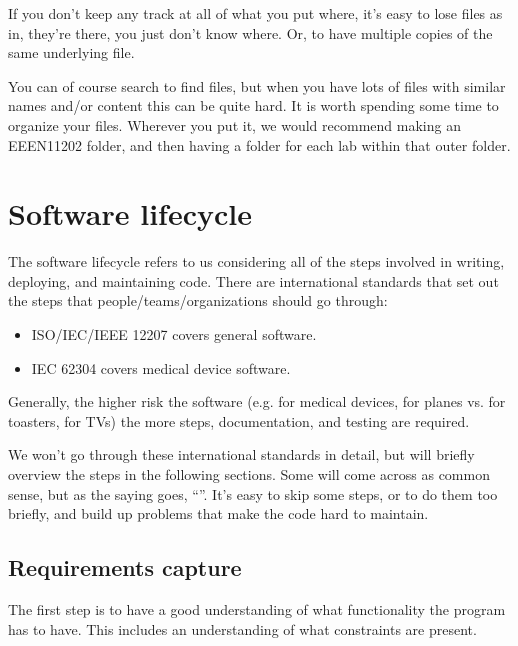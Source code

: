 \documentclass[letterpaper,10pt,british]{sphinxmanual}
\begin{document}
\sphinxAtStartPar
If you don’t keep any track at all of what you put where, it’s easy to lose files \sphinxhyphen{} as in, they’re there, you just don’t know where. Or, to have multiple copies of the same underlying file.

\sphinxAtStartPar
You can of course search to find files, but when you have lots of files with similar names and/or content this can be quite hard. It is worth spending some time to organize your files. Wherever you put it, we would recommend making an EEEN11202 folder, and then having a folder for each lab within that outer folder.

\sphinxstepscope


\chapter{Software lifecycle}
\label{\detokenize{chapters/software_lifecycle:software-lifecycle}}\label{\detokenize{chapters/software_lifecycle::doc}}
\sphinxAtStartPar
The software lifecycle refers to us considering all of the steps involved in writing, deploying, and maintaining code. There are international standards that set out the steps that people/teams/organizations should go through:
\begin{itemize}
\item {} 
\sphinxAtStartPar
ISO/IEC/IEEE 12207 covers general software.

\item {} 
\sphinxAtStartPar
IEC 62304 covers medical device software.

\end{itemize}

\sphinxAtStartPar
Generally, the higher risk the software (e.g. for medical devices, for planes vs. for toasters, for TVs) the more steps, documentation, and testing are required.

\sphinxAtStartPar
We won’t go through these international standards in detail, but will briefly overview the steps in the following sections. Some will come across as common sense, but as the saying goes, “”. It’s easy to skip some steps, or to do them too briefly, and build up problems that make the code hard to maintain.

\sphinxstepscope


\section{Requirements capture}
\label{\detokenize{chapters/software_lifecycle/requirements_capture:requirements-capture}}\label{\detokenize{chapters/software_lifecycle/requirements_capture::doc}}
\sphinxAtStartPar
The first step is to have a good understanding of what functionality the program has to have. This includes an understanding of what constraints are present.
\end{document}
